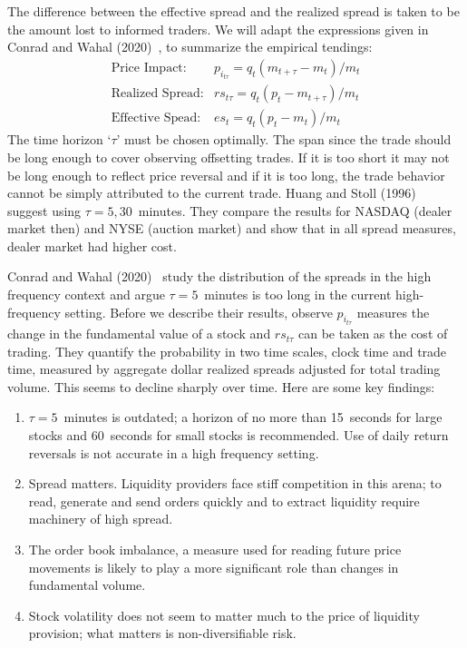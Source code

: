 The difference between the effective spread and the realized spread is taken to be the amount lost to informed traders. We will adapt the expressions given in Conrad and Wahal (2020)~\cite{wahal2020}, to summarize the empirical tendings: 
        \begin{equation} \label{eqn:trends}
        \begin{aligned}
        \text{Price Impact:}& p_{i_{t \tau}}= q_t (m_{t+\tau} - m_t)/m_t \\
        \text{Realized Spread:}& r s_{t \tau}= q_t (p_t - m_{t + \tau})/m_t \\
        \text{Effective Spead:}& es_t= q_t (p_t - m_t)/m_t
        \end{aligned}
        \end{equation}
The time horizon `$\tau$' must be chosen optimally. The span since the trade should be long enough to cover observing offsetting trades. If it is too short it may not be long enough to reflect price reversal and if it is too long, the trade behavior cannot be simply attributed to the current trade. Huang and Stoll (1996)~\cite{huang_stoll1996} suggest using $\tau= 5, 30$~minutes. They compare the results for NASDAQ (dealer market then) and NYSE (auction market) and show that in all spread measures, dealer market had higher cost. 


Conrad and Wahal (2020)~\cite{wahal2020} study the distribution of the spreads in the high frequency context and argue $\tau= 5$~minutes is too long in the current high-frequency setting. Before we describe their results, observe $p_{i_{t \tau}}$ measures the change in the fundamental value of a stock and $rs_{t \tau}$ can be taken as the cost of trading. They quantify the probability in two time scales, clock time and trade time, measured by aggregate dollar realized spreads adjusted for total trading volume. This seems to decline sharply over time. Here are some key findings: 

\begin{enumerate}[--]
\item $\tau=5$~minutes is outdated; a horizon of no more than 15~seconds for large stocks and 60~seconds for small stocks is recommended. Use of daily return reversals is not accurate in a high frequency setting.

\item Spread matters. Liquidity providers face stiff competition in this arena; to read, generate and send orders quickly and to extract liquidity require machinery of high spread. 

\item The order book imbalance, a measure used for reading future price movements is likely to play a more significant role than changes in fundamental volume. 

\item Stock volatility does not seem to matter much to the price of liquidity provision; what matters is non-diversifiable risk. 
\end{enumerate}



